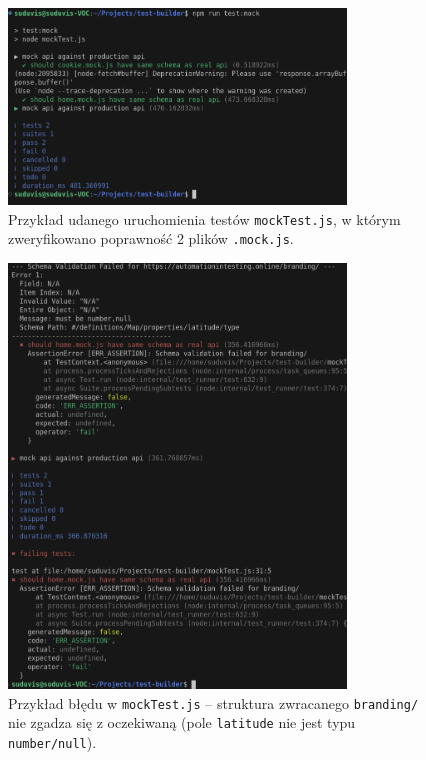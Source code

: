 \documentclass[12pt]{report}
\begin{document}
\begin{figure}[H]
\centering
\includegraphics[width=0.80\textwidth]{mock_test_succes_log.png}
\caption{Przykład udanego uruchomienia testów \texttt{mockTest.js}, w którym zweryfikowano poprawność 2 plików \texttt{.mock.js}.}
\label{fig:mock-test-sucess-log}
\end{figure}

\begin{figure}[H]
\centering
\includegraphics[width=0.80\textwidth]{mock_failure_test_log.png}
\caption{Przykład błędu w \texttt{mockTest.js} – struktura zwracanego \texttt{branding/} nie zgadza się z oczekiwaną (pole \texttt{latitude} nie jest typu \texttt{number/null}).}
\label{fig:mock-test-failure-log}
\end{figure}
\end{document}
